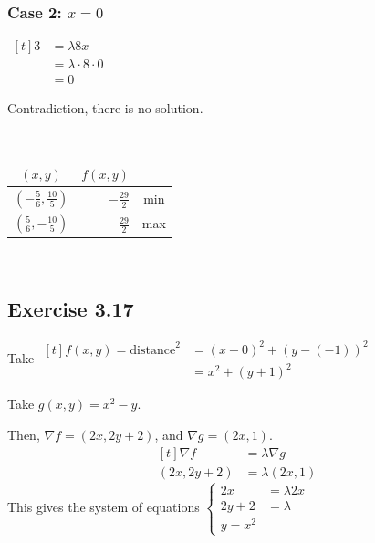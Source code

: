 \subsubsection*{Case 2: $x = 0$}

$\begin{aligned}[t]
    3 & = \lambda 8 x \\
      & = \lambda \cdot 8 \cdot 0 \\
      & = 0
\end{aligned}$

Contradiction, there is no solution. 

{~~~}

\begin{center}
    \begin{tabular}{c | r c}
        $(x, y)$                      & $f(x, y)$             \\
        \hline
        \rule{0pt}{0.75cm}
        $(-\frac{5}{6},\frac{10}{5})$ & $-\frac{29}{2}$ & min \\
        \rule{0pt}{0.75cm}
        $(\frac{5}{6},-\frac{10}{5})$ & $\frac{29}{2}$  & max \\
    \end{tabular}
\end{center}

{~~~}

\subsection*{Exercise 3.17}

Take $\begin{aligned}[t]
    f(x, y) = \text{distance}^2 & = (x - 0)^2 + (y - (-1))^2 \\
                                & = x^2 + (y + 1)^2
\end{aligned}$

Take $g(x, y) = x^2 - y$. 

Then, $\nabla f = (2x, 2y +2)$, and $\nabla g = (2x, 1)$. 
$$\begin{aligned}[t]
    \nabla f   & = \lambda \nabla g \\
    (2x, 2y+2) & = \lambda(2x, 1)
\end{aligned}$$
This gives the system of equations $\begin{cases}
    2x     & = \lambda 2x \\
    2y + 2 & = \lambda    \\
    y = x^2
\end{cases}$

